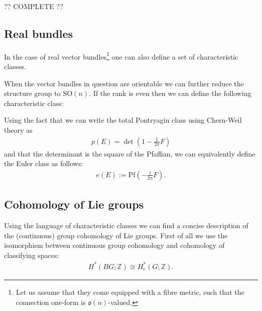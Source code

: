     ?? COMPLETE ??

\subsection{Real bundles}

    In the case of real vector bundles\footnote{Let us assume that they come equipped with a fibre metric, such that the connection one-form is $\mathfrak{o}(n)$-valued.} one can also define a set of characteristic classes.


    When the vector bundles in question are orientable we can further reduce the structure group to $\text{SO}(n)$. If the rank is even then we can define the following characteristic class:
    \begin{property}
        Using the fact that we can write the total Pontryagin class using Chern-Weil theory as
        \begin{gather}
            p(E) = \det\left(1 - \frac{1}{2\pi}F\right)
        \end{gather}
        and that the determinant is the square of the Pfaffian, we can equivalently define the Euler class as follows:
        \begin{gather}
            e(E) := \text{Pf}\left(-\frac{1}{2\pi}F\right).
        \end{gather}
    \end{property}

\subsection{Cohomology of Lie groups}

    Using the language of characteristic classes we can find a concise description of the (continuous) group cohomology of Lie groups. First of all we use the isomorphism between continuous group cohomology and cohomology of classifying spaces:
    \begin{gather}
        H^*(BG; \mathbb{Z})\cong H^*_c(G; \mathbb{Z}).
    \end{gather}

